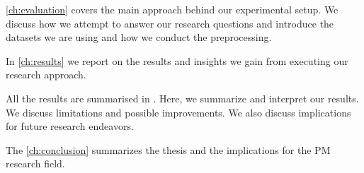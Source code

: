 \documentclass[./../../paper.tex]{subfiles}
\begin{document}
    \autoref{ch:evaluation} covers the main approach behind our experimental setup. We discuss how we attempt to answer our research questions and introduce the datasets we are using and how we conduct the preprocessing. 

    In \autoref{ch:results} we report on the results and insights we gain from executing our research approach. 
    
    All the results are summarised in \autocite{ch:discussion}. Here, we summarize and interpret our results. We discuss limitations and possible improvements. We also discuss implications for future research endeavors. 

    The \autoref{ch:conclusion} summarizes the thesis and the implications for the \Gls{PM} research field.
    
\end{document}
